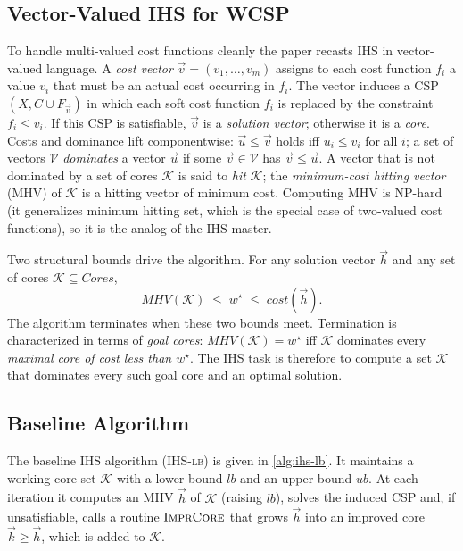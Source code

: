 \subsection{Vector-Valued IHS for WCSP}
\label{sec:vecihs}

To handle multi-valued cost functions cleanly the paper recasts IHS in
vector-valued language. A \emph{cost vector}
$\vec{v} = (v_1, \ldots, v_m)$ assigns to each cost function $f_i$ a value
$v_i$ that must be an actual cost occurring in $f_i$. The vector induces a
CSP $(X, C \cup F_{\vec{v}})$ in which each soft cost function $f_i$ is
replaced by the constraint $f_i \le v_i$. If this CSP is satisfiable, $\vec{v}$
is a \emph{solution vector}; otherwise it is a \emph{core}. Costs and
dominance lift componentwise: $\vec{u} \le \vec{v}$ holds iff $u_i \le v_i$ for
all $i$; a set of vectors $\mathcal{V}$ \emph{dominates} a vector $\vec{u}$
if some $\vec{v} \in \mathcal{V}$ has $\vec{v} \le \vec{u}$. A vector that is
not dominated by a set of cores $\mathcal{K}$ is said to \emph{hit}
$\mathcal{K}$; the \emph{minimum-cost hitting vector} (MHV) of $\mathcal{K}$ is
a hitting vector of minimum cost. Computing MHV is NP-hard (it generalizes
minimum hitting set, which is the special case of two-valued cost functions),
so it is the analog of the IHS master.

Two structural bounds drive the algorithm. For any solution vector $\vec{h}$
and any set of cores $\mathcal{K} \subseteq \mathit{Cores}$,
\[
\mathit{MHV}(\mathcal{K}) \;\le\; w^\star \;\le\; \mathit{cost}(\vec{h}).
\]
The algorithm terminates when these two bounds meet. Termination is
characterized in terms of \emph{goal cores}: $\mathit{MHV}(\mathcal{K}) = w^\star$
iff $\mathcal{K}$ dominates every \emph{maximal core of cost less than
$w^\star$}. The IHS task is therefore to compute a set $\mathcal{K}$ that
dominates every such goal core and an optimal solution.

\subsection{Baseline Algorithm}
\label{sec:baseline}

The baseline IHS algorithm (\textsc{IHS-lb}) is given in
\cref{alg:ihs-lb}. It maintains a working core set $\mathcal{K}$ with
a lower bound $\mathit{lb}$ and an upper bound $\mathit{ub}$. At each
iteration it computes an MHV $\vec{h}$ of $\mathcal{K}$ (raising
$\mathit{lb}$), solves the induced CSP and, if unsatisfiable, calls a routine
$\textsc{ImprCore}$ that grows $\vec{h}$ into an improved core
$\vec{k} \ge \vec{h}$, which is added to $\mathcal{K}$.

